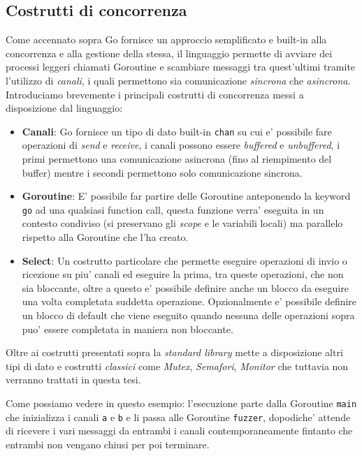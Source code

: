 \subsection{Costrutti di concorrenza}
Come accennato sopra Go fornisce un approccio semplificato e built-in alla concorrenza e alla gestione della stessa, il linguaggio permette di avviare dei processi leggeri chiamati Goroutine e scambiare messaggi tra quest'ultimi tramite l'utilizzo di \emph{canali}, i quali permettono sia comunicazione \emph{sincrona} che \emph{asincrona}.\\
Introduciamo brevemente i principali costrutti di concorrenza messi a disposizione dal linguaggio:
\begin{itemize}
    \item \textbf{Canali}: Go fornisce un tipo di dato built-in \texttt{chan} su cui e' possibile fare operazioni di \emph{send} e \emph{receive}, i canali possono essere \emph{buffered} e \emph{unbuffered}, i primi permettono una comunicazione asincrona (fino al riempimento del buffer) mentre i secondi permettono solo comunicazione sincrona.
    \item \textbf{Goroutine}: E' possibile far partire delle Goroutine anteponendo la keyword \texttt{go} ad una qualsiasi function call, questa funzione verra' eseguita in un contesto condiviso (si preservano gli \emph{scope} e le variabili locali) ma parallelo rispetto alla Goroutine che l'ha creato.
    \item \textbf{Select}: Un costrutto particolare che permette eseguire operazioni di invio o ricezione su piu' canali ed eseguire la prima, tra queste operazioni, che non sia bloccante, oltre a questo e' possibile definire anche un blocco da eseguire una volta completata suddetta operazione. Opzionalmente e' possibile definire un blocco di default che viene eseguito quando nessuna delle operazioni sopra puo' essere completata in maniera non bloccante. 
\end{itemize}
Oltre ai costrutti presentati sopra la \emph{standard library} mette a disposizione altri tipi di dato e costrutti \emph{classici} come \emph{Mutex}, \emph{Semafori}, \emph{Monitor} che tuttavia non verranno trattati in questa tesi. 

\newpage

Come possiamo vedere in questo esempio: l'esecuzione parte dalla Goroutine \texttt{main} che inizializza i canali \texttt{a} e \texttt{b} e li passa alle Goroutine \texttt{fuzzer}, dopodiche' attende di ricevere i vari messaggi da entrambi i canali contemporaneamente fintanto che entrambi non vengano chiusi per poi terminare. 

